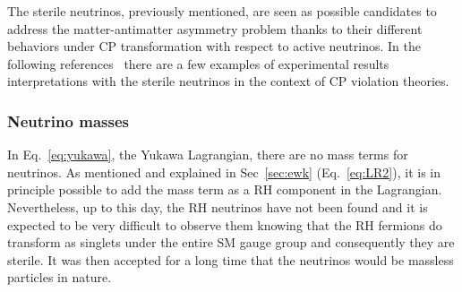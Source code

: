 The sterile neutrinos, previously mentioned, are seen as possible candidates to address the matter-antimatter asymmetry problem thanks to their different behaviors under CP transformation with respect to active neutrinos. In the following references~\cite{Gandhi_2015,Klop_2015,Palazzo_2020}  there are a few examples of experimental results interpretations with the sterile neutrinos in the context of CP violation theories.

\subsubsection{Neutrino masses}
In Eq.~\ref{eq:yukawa}, the Yukawa Lagrangian, there are no mass terms for neutrinos. As mentioned and explained in Sec~\ref{sec:ewk} (Eq.~\ref{eq:LR2}), it is in principle possible to add the mass term as a RH component in the Lagrangian. Nevertheless, up to this day, the RH neutrinos have not been found and it is expected to be very difficult to observe them knowing that the RH fermions do transform as singlets under the entire SM gauge group and consequently they are sterile. It was then accepted for a long time that the neutrinos would be massless particles in nature.

